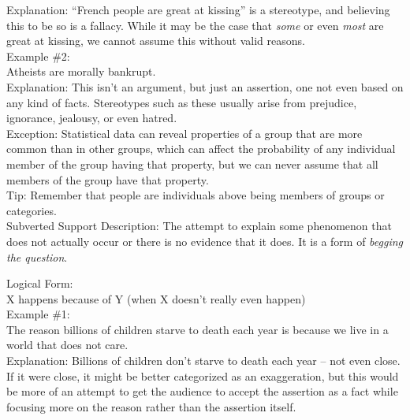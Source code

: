 \documentclass[a4paper,12pt,single,pdftex]{scrbook}
\begin{document}
      
        Explanation: “French people are great at kissing” is a stereotype, and believing this to be so is a fallacy.  While it may be the case that {\it some} or even {\it most} are great at kissing, we cannot assume this without valid reasons.
      \\

      
        Example \#2:
      \\

      
        Atheists are morally bankrupt.
      \\

      
        Explanation: This isn’t an argument, but just an assertion, one not even based on any kind of facts.  Stereotypes such as these usually arise from prejudice, ignorance, jealousy, or even hatred.
      \\

      
        Exception: Statistical data can reveal properties of a group that are more common than in other groups, which can affect the probability of any individual member of the group having that property, but we can never assume that all members of the group have that property.
      \\

      
        Tip: Remember that people are individuals above being members of groups or categories.
      \\

    
  

Subverted Support
    Description: The attempt to explain some phenomenon that does not actually occur or there is no evidence that it does.  It is a form of {\it begging the question}.

    
      Logical Form:
    \\

    
      X happens because of Y (when X doesn’t really even happen)
    \\

    
      Example \#1:
    \\

    
      The reason billions of children starve to death each year is because we live in a world that does not care.
    \\

    
      Explanation: Billions of children don’t starve to death each year -- not even close.  If it were close, it might be better categorized as an exaggeration, but this would be more of an attempt to get the audience to accept the assertion as a fact while focusing more on the reason rather than the assertion itself.
    \\
\end{document}
